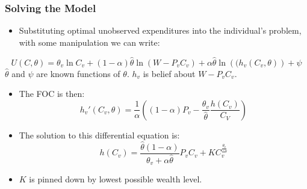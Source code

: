 \documentclass{beamer}
\begin{document}
%
\begin{frame}
  \frametitle{Solving the Model}
  \begin{itemize}
    \item Substituting optimal unobserved expenditures into the individual's problem, with some manipulation we can write:
  \end{itemize}
      \[
	U(C,\theta) = \theta_v \ln C_v + \left(1-\alpha \right)\hat{\theta} \ln (W-P_v C_v)  + \alpha \hat{\theta} \ln\left((h_v(C_v,\theta)\right) + \psi
      \]
      \hspace{.75cm} $\hat{\theta}$ and $\psi$ are known functions of $\theta$. $h_v$ is belief about $W-P_v C_v$.
      \begin{itemize}
    \item The FOC is then:
      \[
	h_v'(C_v,\theta) = \frac{1}{\alpha}\left(\left( 1-\alpha \right)P_v-\frac{\theta_v}{\hat{\theta}}\frac{h(C_v)}{C_V}  \right)	
      \]
    \item The solution to this differential equation is:
      \[
	h(C_v) = \frac{\hat{\theta}(1-\alpha)}{\theta_v + \alpha \hat{\theta}}P_v C_v + K C_v^{\frac{\theta_v}{\alpha \hat{\theta}}} 
      \]
    \item $K$ is pinned down by lowest possible wealth level.
  \end{itemize}
 \end{frame}
\end{document}
